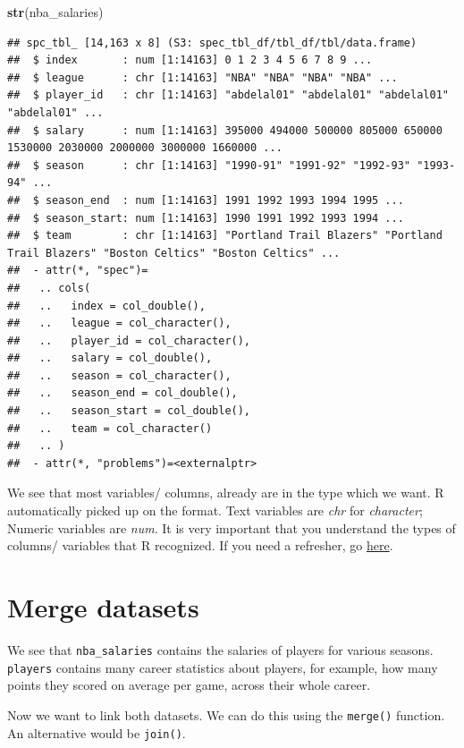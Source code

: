 \documentclass[
]{book}
\newenvironment{Shaded}{\begin{snugshade}}{\end{snugshade}}
\newcommand{\FunctionTok}[1]{\textcolor[rgb]{0.13,0.29,0.53}{\textbf{#1}}}
\newcommand{\NormalTok}[1]{#1}
\begin{document}
\begin{Shaded}
\begin{Highlighting}[]
\FunctionTok{str}\NormalTok{(nba\_salaries)}
\end{Highlighting}
\end{Shaded}

\begin{verbatim}
## spc_tbl_ [14,163 x 8] (S3: spec_tbl_df/tbl_df/tbl/data.frame)
##  $ index       : num [1:14163] 0 1 2 3 4 5 6 7 8 9 ...
##  $ league      : chr [1:14163] "NBA" "NBA" "NBA" "NBA" ...
##  $ player_id   : chr [1:14163] "abdelal01" "abdelal01" "abdelal01" "abdelal01" ...
##  $ salary      : num [1:14163] 395000 494000 500000 805000 650000 1530000 2030000 2000000 3000000 1660000 ...
##  $ season      : chr [1:14163] "1990-91" "1991-92" "1992-93" "1993-94" ...
##  $ season_end  : num [1:14163] 1991 1992 1993 1994 1995 ...
##  $ season_start: num [1:14163] 1990 1991 1992 1993 1994 ...
##  $ team        : chr [1:14163] "Portland Trail Blazers" "Portland Trail Blazers" "Boston Celtics" "Boston Celtics" ...
##  - attr(*, "spec")=
##   .. cols(
##   ..   index = col_double(),
##   ..   league = col_character(),
##   ..   player_id = col_character(),
##   ..   salary = col_double(),
##   ..   season = col_character(),
##   ..   season_end = col_double(),
##   ..   season_start = col_double(),
##   ..   team = col_character()
##   .. )
##  - attr(*, "problems")=<externalptr>
\end{verbatim}

We see that most variables/ columns, already are in the type which we want. R automatically picked up on the format. Text variables are \emph{chr} for \emph{character}; Numeric variables are \emph{num}. It is very important that you understand the types of columns/ variables that R recognized. If you need a refresher, go \href{https://jaspertjaden.github.io/course-intro2r/}{here}.

\hypertarget{merge-datasets}{%
\section{Merge datasets}\label{merge-datasets}}

We see that \texttt{nba\_salaries} contains the salaries of players for various seasons.
\texttt{players} contains many career statistics about players, for example, how many points they scored on average per game, across their whole career.

Now we want to link both datasets. We can do this using the \texttt{merge()} function.
An alternative would be \texttt{join()}.
\end{document}
